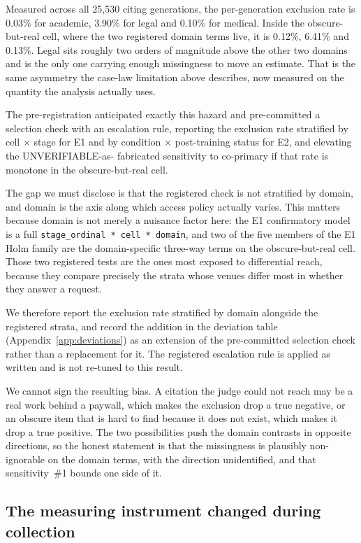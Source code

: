 Measured across all 25,530 citing generations, the per-generation exclusion rate is 0.03\% for academic, 3.90\% for legal and 0.10\% for medical. Inside the obscure-but-real cell, where the two registered domain terms live, it is 0.12\%, 6.41\% and 0.13\%. Legal sits roughly two orders of magnitude above the other two domains and is the only one carrying enough missingness to move an estimate. That is the same asymmetry the case-law limitation above describes, now measured on the quantity the analysis actually uses.

The pre-registration anticipated exactly this hazard
and pre-committed a selection check with an escalation rule, reporting the
exclusion rate stratified by cell $\times$ stage for E1 and by condition
$\times$ post-training status for E2, and elevating the UNVERIFIABLE-as-
fabricated sensitivity to co-primary if that rate is monotone in the
obscure-but-real cell.

The gap we must disclose is that the registered check is not stratified by
domain, and domain is the axis along which access policy actually varies. This
matters because domain is not merely a nuisance factor here: the E1 confirmatory
model is a full \texttt{stage\_ordinal * cell * domain}, and two of the five
members of the E1 Holm family are the domain-specific three-way terms on the
obscure-but-real cell. Those two registered tests are the ones most exposed to
differential reach, because they compare precisely the strata whose venues
differ most in whether they answer a request.

We therefore report the exclusion rate stratified by domain alongside the
registered strata, and record the addition in the deviation table
(Appendix~\ref{app:deviations}) as an extension of the pre-committed selection
check rather than a replacement for it. The registered escalation rule is
applied as written and is not re-tuned to this result.

We cannot sign the resulting bias. A citation the judge could not reach may be a
real work behind a paywall, which makes the exclusion drop a true negative, or
an obscure item that is hard to find because it does not exist, which makes it
drop a true positive. The two possibilities push the domain contrasts in
opposite directions, so the honest statement is that the missingness is
plausibly non-ignorable on the domain terms, with the direction unidentified,
and that sensitivity~\#1 bounds one side of it.

\subsection{The measuring instrument changed during collection}

